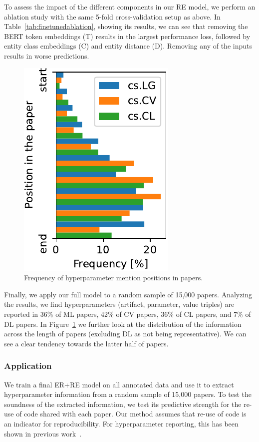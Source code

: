 To assess the impact of the different components in our RE model, we perform an ablation study with the same 5-fold cross-validation setup as above. In Table~\ref{tab:finetunedablation}, showing its results, we can see that removing the BERT token embeddings (T) results in the largest performance loss, followed by entity class embeddings (C) and entity distance (D). Removing any of the inputs results in worse predictions.

\begin{figure}
  \centering
  \includegraphics[width=0.3\linewidth]{figures/ref_params/hyperparam_pos-crop}
  \caption{Frequency of hyperparameter mention positions in papers.}
  \label{fig:hyperparam_info_pos}
\end{figure}


Finally, we apply our full model to a random sample of 15,000 papers. Analyzing the results, we find hyperparameters (artifact, parameter, value triples) are reported in 36\% of ML papers, 42\% of CV papers, 36\% of CL papers, and 7\% of DL papers. In Figure~\ref{fig:hyperparam_info_pos} we further look at the distribution of the information across the length of papers (excluding DL as not being representative). We can see a clear tendency towards the latter half of papers.

\subsubsection{Application}

We train a final ER+RE model on all annotated data and use it to extract hyperparameter information from a random sample of 15,000 papers. To test the soundness of the extracted information, we test its predictive strength for the re-use of code shared with each paper. Our method assumes that re-use of code is an indicator for reproducibility. For hyperparameter reporting, this has been shown in previous work~\cite{Radd2019}.

